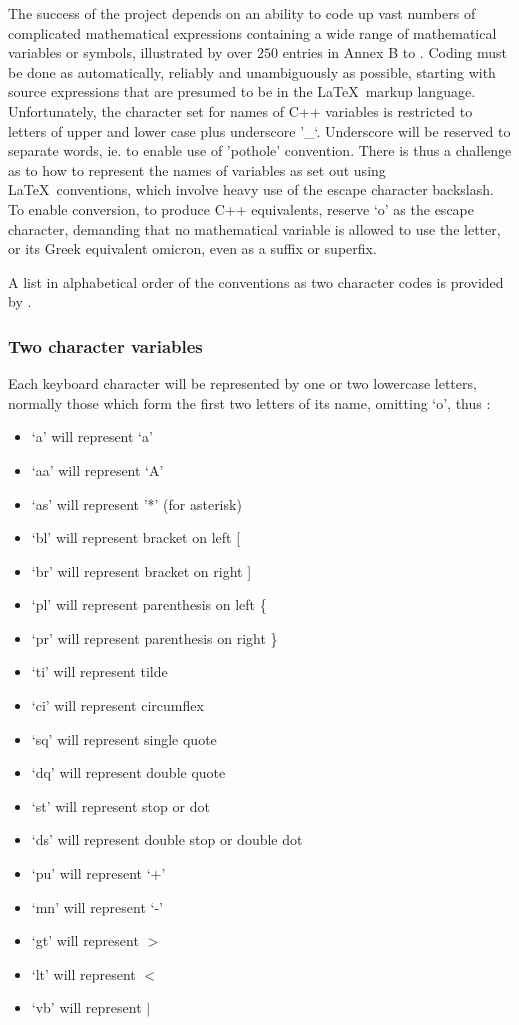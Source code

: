 The success of the project depends on an ability to code up vast numbers
of complicated mathematical expressions containing a wide range of
mathematical variables or symbols, illustrated by over $250$ entries
in Annex B to \cite{pappeqs3}. Coding must be done as automatically, reliably
and unambiguously as possible, starting with source expressions that are
presumed to be in the \LaTeX \ markup language. Unfortunately, the
character set for names of C++ variables is restricted to letters of
upper and lower case plus underscore '\_`. Underscore will be reserved
to separate words, ie. to enable use of 'pothole' convention. There is
thus a challenge as to how to represent the names of variables as set
out using \LaTeX \ conventions, which involve heavy use of the escape
character backslash. To enable conversion, to produce C++ equivalents,
reserve `o' as the escape character, demanding that no mathematical
variable is allowed to use the letter, or its Greek equivalent omicron,
even as a suffix or superfix.

A list in alphabetical order of the conventions as two character codes
is provided by .

\subsubsection{Two character variables}\label{sec:two-character-variables}

Each keyboard character will be represented by one or two lowercase
letters, normally those which form the first two letters of its name,
omitting `o', thus :

\begin{itemize}
\item `a' will represent `a'
\item `aa' will represent `A'
\item `as' will represent '*' (for asterisk)
\item `bl' will represent bracket on left {[}
\item `br' will represent bracket on right {]}
\item `pl' will represent parenthesis on left \{
\item `pr' will represent parenthesis on right \}
\item `ti' will represent tilde
\item `ci' will represent circumflex
\item `sq' will represent single quote
\item `dq' will represent double quote
\item `st' will represent stop or dot
\item `ds' will represent double stop or double dot
\item `pu' will represent `+'
\item `mn' will represent `-'
\item `gt' will represent $>$
\item `lt' will represent $<$
\item `vb' will represent $|$
\end{itemize}

